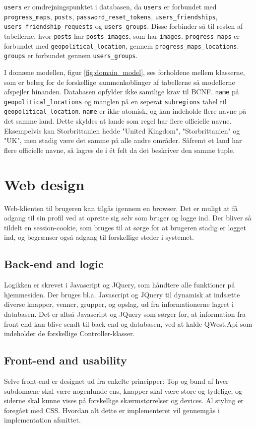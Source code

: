 \texttt{users} er omdrejningspunktet i databasen, da \texttt{users} er forbundet med \texttt{progress\_maps}, \texttt{posts}, \texttt{password\_reset\_tokens}, \texttt{users\_friendships}, \texttt{users\_friendship\_requests} og \texttt{users\_groups}. Disse forbinder så til resten af tabellerne, hvor \texttt{posts} har \texttt{posts\_images}, som har \texttt{images}. \texttt{progress\_maps} er forbundet med \texttt{geopolitical\_location}, gennem \texttt{progress\_maps\_locations}. \texttt{groups} er forbundet gennem \texttt{users\_groups}.

I domæne modellen, figur \ref{fig:domain_model}, ses forholdene mellem klasserne, som er belæg for de forskellige sammenkoblinger af tabellerne så modellerne afspejler hinanden. Databasen opfylder ikke samtlige krav til BCNF\cite{bcnf}. \texttt{name} på \texttt{geopolitical\_locations} og manglen på en seperat \texttt{subregions} tabel til \texttt{geopolitical\_location}. \texttt{name} er ikke atomisk, og kan indeholde flere navne på det samme land. Dette skyldes at lande som regel har flere officielle navne. Eksempelvis kan Storbrittanien hedde "United Kingdom", "Storbrittanien" og "UK", men stadig være det samme på alle andre områder. Såfremt et land har flere officielle navne, så lagres de i ét felt da det beskriver den samme tuple.

\section{Web design}\label{sec:webdesign}
Web-klienten til brugeren kan tilgås igennem en browser. Det er muligt at få adgang til sin profil ved at oprette sig selv som bruger og logge ind. Der bliver så tildelt en session-cookie, som bruges til at sørge for at brugeren stadig er logget ind, og begrænser også adgang til forskellige steder i systemet. 
\subsection{Back-end and logic}\label{sec:backend}
Logikken er skrevet i Javascript og JQuery, som håndtere alle funktioner på hjemmesiden. Der bruges bl.a. Javascript og JQuery til dynamisk at indsætte diverse knapper, venner, grupper, og opslag, ud fra informationerne lagret i databasen. Det er altså Javascript og JQuery som sørger for, at information fra front-end kan blive sendt til back-end og databasen, ved at kalde QWest.Api som indeholder de forskellige Controller-klasser. 
\subsection{Front-end and usability}\label{sec:frontend}
Selve front-end er designet ud fra enkelte principper: Top og bund af hver subdomæne skal være nogenlunde ens, knapper skal være store og tydelige, og siderne skal kunne vises på forskellige skærmstørrelser og devices. Al styling er foregået med CSS. Hvordan alt dette er implementeret vil gennemgås i implementation afsnittet.
